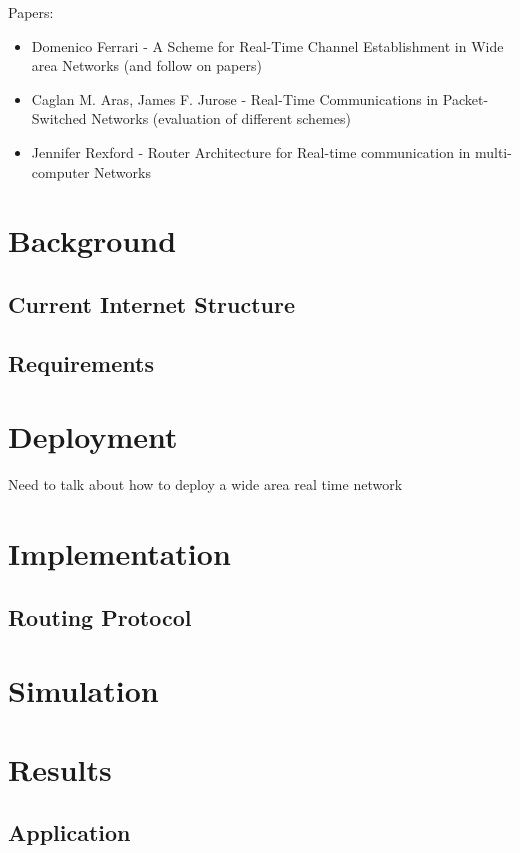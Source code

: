 \documentclass[times, 10pt,twocolumn]{article}
\begin{document}
Papers:
\begin{itemize}
\item Domenico Ferrari - A Scheme for Real-Time Channel Establishment in Wide area Networks (and follow on papers)
\item Caglan M. Aras, James F. Jurose - Real-Time Communications in Packet-Switched Networks (evaluation of different schemes)
\item Jennifer Rexford - Router Architecture for Real-time communication in multi-computer Networks
\end{itemize}



\section{Background}
\subsection{Current Internet Structure}

\subsection{Requirements}

\section{Deployment}
Need to talk about how to deploy a wide area real time network



\section{Implementation}
\subsection{Routing Protocol}


\section {Simulation}

\section{Results}

\subsection{Application}
\end{document}
